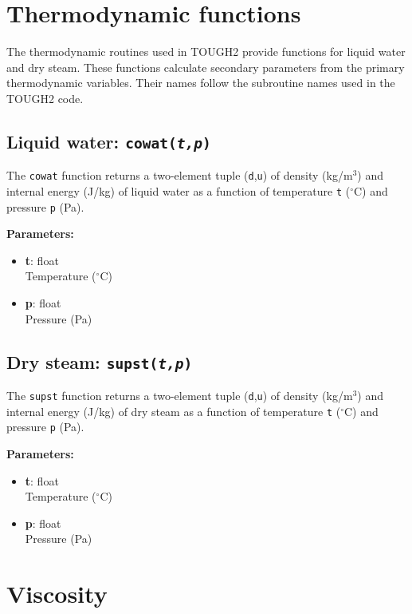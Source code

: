 \section{Thermodynamic functions}

The thermodynamic routines used in TOUGH2 provide functions for liquid water and dry steam.  These functions calculate secondary parameters from the primary thermodynamic variables.  Their names follow the subroutine names used in the TOUGH2 code.

\subsection{Liquid water: \texttt{cowat(\emph{t,p})}}
\label{sec:t2thermo:cowat}

The \texttt{cowat} function returns a two-element tuple (\texttt{d},\texttt{u}) of density (kg/m$^3$) and internal energy (J/kg) of liquid water as a function of temperature \texttt{t} ($^{\circ}$C) and pressure \texttt{p} (Pa).

\textbf{Parameters:}
\begin{itemize}
\item \textbf{t}: float\\
  Temperature ($^{\circ}$C)
\item \textbf{p}: float\\
  Pressure (Pa)
\end{itemize}

\subsection{Dry steam: \texttt{supst(\emph{t,p})}}
\label{sec:t2thermo:supst}

The \texttt{supst} function returns a two-element tuple (\texttt{d},\texttt{u}) of density (kg/m$^3$) and internal energy (J/kg) of dry steam as a function of temperature \texttt{t} ($^{\circ}$C) and pressure \texttt{p} (Pa).

\textbf{Parameters:}
\begin{itemize}
\item \textbf{t}: float\\
  Temperature ($^{\circ}$C)
\item \textbf{p}: float\\
  Pressure (Pa)
\end{itemize}

\section{Viscosity}


